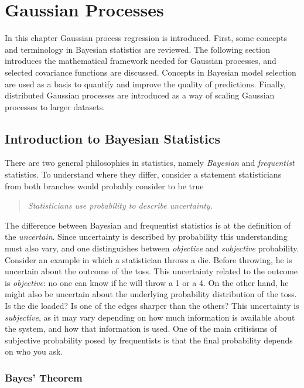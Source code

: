 \documentclass[twoside,english]{uiofysmaster}
\begin{document}
\chapter{Gaussian Processes}




In this chapter Gaussian process regression is introduced. First, some concepts and terminology in Bayesian statistics are reviewed. The following section introduces the mathematical framework needed for Gaussian processes, and selected covariance functions are discussed. Concepts in Bayesian model selection are used as a basis to quantify and improve the quality of predictions. Finally, distributed Gaussian processes are introduced as a way of scaling Gaussian processes to larger datasets.

\section{Introduction to Bayesian Statistics}

There are two general philosophies in statistics, namely \textit{Bayesian} and \textit{frequentist} statistics. To understand where they differ, consider a statement statisticians from both branches would probably consider to be true
\begin{quote}
\textit{Statisticians use probability to describe uncertainty.}
\end{quote}
The difference between Bayesian and frequentist statistics is at the definition of the \textit{uncertain}. Since uncertainty is described by probability this understanding must also vary, and one distinguishes between \textit{objective} and \textit{subjective} probability. Consider an example in which a statistician throws a die. Before throwing, he is uncertain about the outcome of the toss. This uncertainty related to the outcome is \textit{objective}: no one can know if he will throw a 1 or a 4. On the other hand, he might also be uncertain about the underlying probability distribution of the toss. Is the die loaded? Is one of the edges sharper than the others? This uncertainty is \textit{subjective}, as it may vary depending on how much information is available about the system, and how that information is used. One of the main critisisms of subjective probability posed by frequentists is that the final probability depends on who you ask.

\subsection{Bayes' Theorem}
\end{document}
